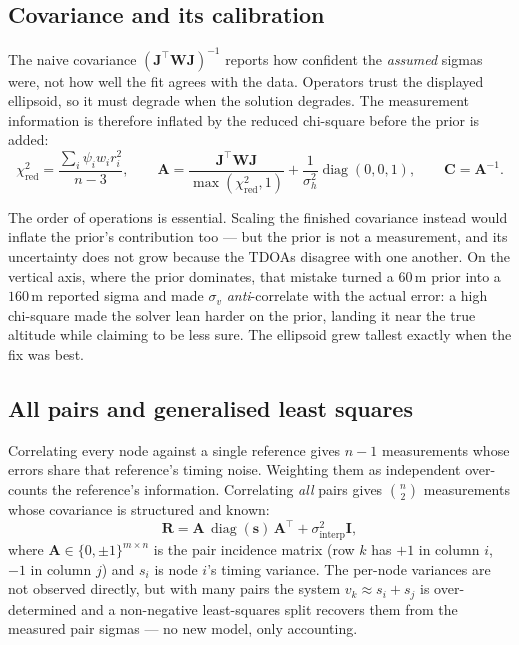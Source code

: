 \documentclass[11pt,a4paper]{article}
\DeclareMathOperator{\diag}{diag}
\begin{document}
\subsection{Covariance and its calibration}

The naive covariance $(\mathbf{J}^\top\mathbf{W}\mathbf{J})^{-1}$ reports how
confident the \emph{assumed} sigmas were, not how well the fit agrees with
the data. Operators trust the displayed ellipsoid, so it must degrade when
the solution degrades. The measurement information is therefore inflated by
the reduced chi-square before the prior is added:
\begin{equation}
  \chi^{2}_{\text{red}} = \frac{\sum_i \psi_i w_i r_i^{2}}{n-3},
  \qquad
  \mathbf{A} = \frac{\mathbf{J}^\top\mathbf{W}\mathbf{J}}{\max(\chi^{2}_{\text{red}},1)}
  + \frac{1}{\sigma_h^{2}}\diag(0,0,1),
  \qquad \mathbf{C}=\mathbf{A}^{-1}.
  \label{eq:cov}
\end{equation}

The order of operations is essential. Scaling the finished covariance
instead would inflate the prior's contribution too --- but the prior is not
a measurement, and its uncertainty does not grow because the TDOAs disagree
with one another. On the vertical axis, where the prior dominates, that
mistake turned a $60$\,m prior into a $160$\,m reported sigma and made
$\sigma_v$ \emph{anti}-correlate with the actual error: a high chi-square
made the solver lean harder on the prior, landing it near the true altitude
while claiming to be less sure. The ellipsoid grew tallest exactly when the
fix was best.

\subsection{All pairs and generalised least squares}

Correlating every node against a single reference gives $n-1$ measurements
whose errors share that reference's timing noise. Weighting them as
independent over-counts the reference's information. Correlating \emph{all}
pairs gives $\binom{n}{2}$ measurements whose covariance is structured and
known:
\begin{equation}
  \mathbf{R} = \mathbf{A}\,\diag(\mathbf{s})\,\mathbf{A}^\top
             + \sigma_{\text{interp}}^{2}\mathbf{I},
  \label{eq:pairR}
\end{equation}
where $\mathbf{A}\in\{0,\pm1\}^{m\times n}$ is the pair incidence matrix
(row $k$ has $+1$ in column $i$, $-1$ in column $j$) and $s_i$ is node $i$'s
timing variance. The per-node variances are not observed directly, but with
many pairs the system $v_k \approx s_i + s_j$ is over-determined and a
non-negative least-squares split recovers them from the measured pair
sigmas --- no new model, only accounting.
\end{document}
